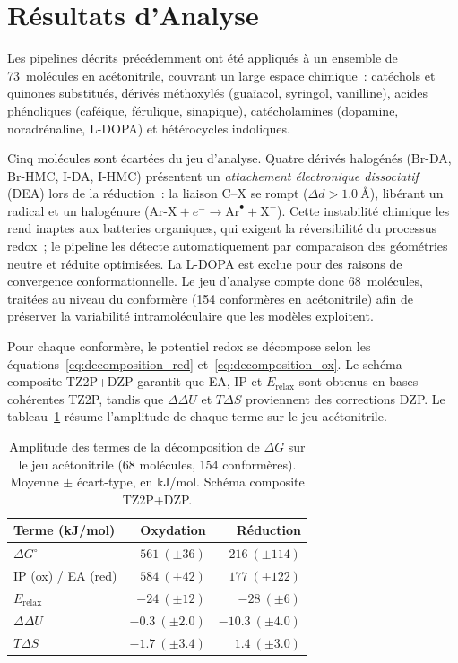 \section{Résultats d'Analyse}
\label{sec:analyse}

Les pipelines décrits précédemment ont été appliqués à un ensemble de 73~molécules en acétonitrile, couvrant un large espace chimique~: catéchols et quinones substitués, dérivés méthoxylés (guaïacol, syringol, vanilline), acides phénoliques (caféique, férulique, sinapique), catécholamines (dopamine, noradrénaline, L-DOPA) et hétérocycles indoliques.

Cinq molécules sont écartées du jeu d'analyse. Quatre dérivés halogénés (Br-DA, Br-HMC, I-DA, I-HMC) présentent un \emph{attachement électronique dissociatif} (DEA) lors de la réduction~: la liaison C--X se rompt ($\Delta d > \SI{1.0}{\angstrom}$), libérant un radical et un halogénure ($\text{Ar-X} + e^- \to \text{Ar}^\bullet + \text{X}^-$). Cette instabilité chimique les rend inaptes aux batteries organiques, qui exigent la réversibilité du processus redox~; le pipeline les détecte automatiquement par comparaison des géométries neutre et réduite optimisées. La L-DOPA est exclue pour des raisons de convergence conformationnelle. Le jeu d'analyse compte donc 68~molécules, traitées au niveau du conformère (154 conformères en acétonitrile) afin de préserver la variabilité intramoléculaire que les modèles exploitent.

Pour chaque conformère, le potentiel redox se décompose selon les équations~\ref{eq:decomposition_red} et~\ref{eq:decomposition_ox}. Le schéma composite TZ2P+DZP garantit que EA, IP et $E_{\text{relax}}$ sont obtenus en bases cohérentes TZ2P, tandis que $\Delta\Delta U$ et $T\Delta S$ proviennent des corrections DZP. Le tableau~\ref{tab:decomp_stats} résume l'amplitude de chaque terme sur le jeu acétonitrile.

\begin{table}[htbp]
\centering
\caption{Amplitude des termes de la décomposition de $\Delta G$ sur le jeu acétonitrile (68 molécules, 154 conformères). Moyenne $\pm$ écart-type, en kJ/mol. Schéma composite TZ2P+DZP.}
\label{tab:decomp_stats}
\footnotesize
\begin{tabular}{l r r}
\toprule
\textbf{Terme} (kJ/mol) & \textbf{Oxydation} & \textbf{Réduction} \\
\midrule
$\Delta G^\circ$              & $561~(\pm 36)$   & $-216~(\pm 114)$ \\
IP (ox) / EA (red)            & $584~(\pm 42)$   & $177~(\pm 122)$  \\
$E_{\text{relax}}$            & $-24~(\pm 12)$   & $-28~(\pm 6)$    \\
$\Delta\Delta U$              & $-0.3~(\pm 2.0)$ & $-10.3~(\pm 4.0)$ \\
$T\Delta S$                   & $-1.7~(\pm 3.4)$ & $1.4~(\pm 3.0)$  \\
\bottomrule
\end{tabular}
\end{table}

